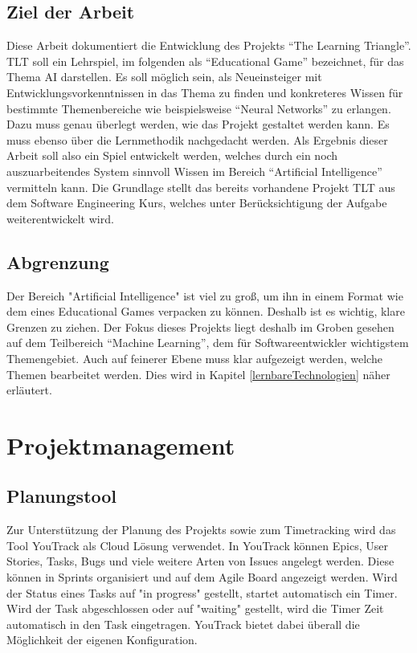 \subsection{Ziel der Arbeit}

Diese Arbeit dokumentiert die Entwicklung des Projekts "`The Learning Triangle"'. TLT soll ein Lehrspiel, im folgenden als "`Educational Game"' bezeichnet, für das Thema AI darstellen. Es soll möglich sein, als Neueinsteiger mit Entwicklungsvorkenntnissen in das Thema zu finden und konkreteres Wissen für bestimmte Themenbereiche wie beispielsweise "`Neural Networks"' zu erlangen. Dazu muss genau überlegt werden, wie das Projekt gestaltet werden kann. Es muss ebenso über die Lernmethodik nachgedacht werden. Als Ergebnis dieser Arbeit soll also ein Spiel entwickelt werden, welches durch ein noch auszuarbeitendes System sinnvoll Wissen im Bereich "`Artificial Intelligence"' vermitteln kann. Die Grundlage stellt das bereits vorhandene Projekt TLT aus dem Software Engineering Kurs, welches unter Berücksichtigung der Aufgabe weiterentwickelt wird.

\subsection{Abgrenzung}

Der Bereich "Artificial Intelligence" ist viel zu groß, um ihn in einem Format wie dem eines Educational Games verpacken zu können. Deshalb ist es wichtig, klare Grenzen zu ziehen. Der Fokus dieses Projekts liegt deshalb im Groben gesehen auf dem Teilbereich "`Machine Learning"', dem für Softwareentwickler wichtigstem Themengebiet. Auch auf feinerer Ebene muss klar aufgezeigt werden, welche Themen bearbeitet werden. Dies wird in Kapitel \ref{lernbareTechnologien} näher erläutert.

\section{Projektmanagement}

\subsection{Planungstool}

Zur Unterstützung der Planung des Projekts sowie zum Timetracking wird das Tool YouTrack als Cloud Lösung verwendet. In YouTrack können Epics, User Stories, Tasks, Bugs und viele weitere Arten von Issues angelegt werden. Diese können in Sprints organisiert und auf dem Agile Board angezeigt werden. Wird der Status eines Tasks auf "in progress" gestellt, startet automatisch ein Timer. Wird der Task abgeschlossen oder auf "waiting" gestellt, wird die Timer Zeit automatisch in den Task eingetragen. YouTrack bietet dabei überall die Möglichkeit der eigenen Konfiguration.

